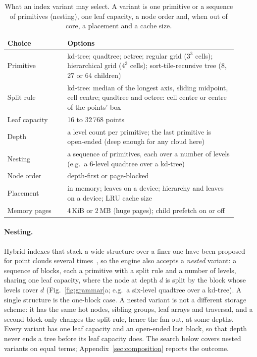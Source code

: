 \begin{table}[t]
\centering\footnotesize
\caption{What an index variant may select. A variant is one primitive or a sequence of primitives (nesting), one leaf capacity, a node order and, when out of core, a placement and a cache size.}
\label{tab:designspace}
\begin{tabular}{p{0.24\linewidth}p{0.68\linewidth}}
\toprule
Choice & Options \\
\midrule
Primitive & kd-tree; quadtree; octree; regular grid ($3^3$ cells); hierarchical grid ($4^3$ cells); sort-tile-recursive tree (8, 27 or 64 children) \\
Split rule & kd-tree: median of the longest axis, sliding midpoint, cell centre; quadtree and octree: cell centre or centre of the points' box \\
Leaf capacity & 16 to 32\,768 points \\
Depth & a level count per primitive; the last primitive is open-ended (deep enough for any cloud here) \\
Nesting & a sequence of primitives, each over a number of levels (e.g.\ a 6-level quadtree over a kd-tree) \\
Node order & depth-first or page-blocked \\
Placement & in memory; leaves on a device; hierarchy and leaves on a device; LRU cache size \\
Memory pages & 4\,KiB or 2\,MB (huge pages); child prefetch on or off \\
\bottomrule
\end{tabular}
\end{table}

\paragraph{Nesting.} Hybrid indexes that stack a wide structure over a finer one have been proposed for point clouds several times~\cite{wang2021hybridpointcloud,park2021nestedoctree,ogayar2023nestedlidar}, so the engine also accepts a \emph{nested} variant: a sequence of blocks, each a primitive with a split rule and a number of levels, sharing one leaf capacity, where the node at depth $d$ is split by the block whose levels cover $d$ (Fig.~\ref{fig:grammar}a; e.g.\ a six-level quadtree over a kd-tree). A single structure is the one-block case. A nested variant is not a different storage scheme: it has the same hot nodes, sibling groups, leaf arrays and traversal, and a second block only changes the split rule, hence the fan-out, at some depths. Every variant has one leaf capacity and an open-ended last block, so that depth never ends a tree before its leaf capacity does. The search below covers nested variants on equal terms; Appendix~\ref{sec:composition} reports the outcome.

